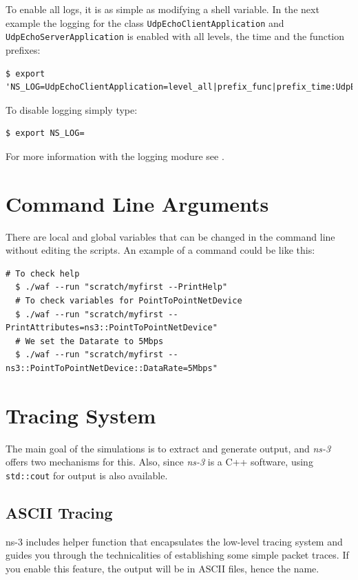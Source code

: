 To enable all logs, it is as simple as modifying a shell variable. In the next example the logging for the class
\texttt{UdpEchoClientApplication} and \texttt{UdpEchoServerApplication} is enabled with all levels, the time 
and the function prefixes:

\begin{lstlisting}[escapechar=@, language=myshell,caption={Enabling logging in ns-3}, captionpos=b]
  $ export 'NS_LOG=UdpEchoClientApplication=level_all|prefix_func|prefix_time:UdpEchoServerApplication=level_all|prefix_func|prefix_time'
\end{lstlisting}

To disable logging simply type:

\begin{lstlisting}[escapechar=@, language=myshell,caption={Disabling logging in ns-3}, captionpos=b]
  $ export NS_LOG=
\end{lstlisting}

For more information with the logging modure see \cite{ns3}.

\section{Command Line Arguments}
There are local and global variables that can be changed in the command line without
editing the scripts. An example of a command could be like this:

\begin{lstlisting}[escapechar=@, language=myshell,caption={Command line arguments}, captionpos=b]
  # To check help 
  $ ./waf --run "scratch/myfirst --PrintHelp"
  # To check variables for PointToPointNetDevice
  $ ./waf --run "scratch/myfirst --PrintAttributes=ns3::PointToPointNetDevice"
  # We set the Datarate to 5Mbps
  $ ./waf --run "scratch/myfirst --ns3::PointToPointNetDevice::DataRate=5Mbps"
\end{lstlisting}

\section{Tracing System}
The main goal of the simulations is to extract and generate output, and \textit{ns-3} offers two
mechanisms for this. Also, since \textit{ns-3} is a C++ software, using \texttt{std::cout} for
output is also available.

\subsection{ASCII Tracing}
ns-3 includes helper function that encapsulates the low-level tracing system and guides you 
through the technicalities of establishing some simple packet traces. If you enable this feature, 
the output will be in ASCII files, hence the name.

